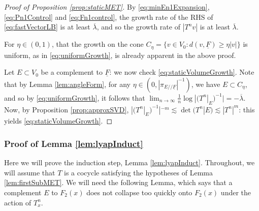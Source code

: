 \documentclass[11pt]{amsart}
\theoremstyle{theorem}
\theoremstyle{definition}
\numberwithin{equation}{section}
\newcommand{\ds}{/ \! /}
\newcommand{\ol}{\overline{\lambda}}
\begin{document}
\begin{proof}[Proof of Proposition \ref{prop:staticMET}]
By \eqref{eq:minEn1Expansion}, \eqref{eq:Pn1Control} and \eqref{eq:Fn1control}, the growth rate of the RHS of \eqref{eq:fastVectorLB} is at least $\ol$, and so the growth rate of $|T^n v|$ is at least $\ol$. 

For $\eta \in (0,1)$, that the growth on the cone $C_{\eta} = \{v \in V_0 :  d(v, \underline{F}) \geq \eta |v|\}$ is uniform, as in \eqref{eq:uniformGrowth}, is already apparent in the above proof.

Let $E \subset V_0$ be a complement to $\underline{F}$: we now check \eqref{eq:staticVolumeGrowth}. Note that by Lemma \ref{lem:angleForm}, for any $\eta \in (0, |\pi_{E \ds \underline{F}}|^{-1})$, we have $E \subset C_{\eta}$, and so by \eqref{eq:uniformGrowth}, it follows that $\lim_{n \to \infty} \frac{1}{n} \log |(T^n|_E)^{-1}| = - \ol$. Now, by Proposition \ref{prop:approxSVD}, $|(T^n|_E)^{-1}|^{-m} \lesssim \det(T^n|E) \lesssim |T^n|^m$: this yields \eqref{eq:staticVolumeGrowth}.
\end{proof}

\subsubsection{Proof of Lemma \ref{lem:lyapInduct}}

Here we will prove the induction step, Lemma \ref{lem:lyapInduct}. Throughout, we will assume that $T$ is a cocycle satisfying the hypotheses of Lemma \ref{lem:firstSubMET}. We will need the following Lemma, which says that a complement $E$ to $F_2(x)$ does not collapse too quickly onto $F_2(x)$ under the action of $T^n_x$.
\end{document}
